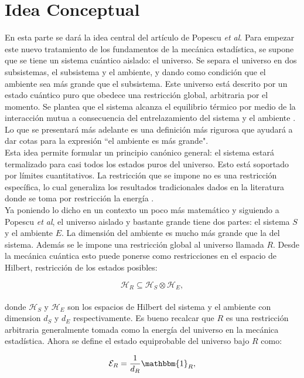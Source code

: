 \section{Idea Conceptual}
En esta parte se dará la idea central del artículo de Popescu \textit{et al}. Para empezar este nuevo tratamiento de los fundamentos de la mecánica estadística, se supone que se tiene un sistema cuántico aislado: el universo. Se separa el universo en dos subsistemas, el subsistema y el ambiente, y dando como condición que el ambiente sea más grande que el subsistema. Este universo está descrito por un estado cuántico puro que obedece una restricción global, arbitraria por el momento. Se plantea que el sistema alcanza el equilibrio térmico por medio de la interacción mutua a consecuencia del entrelazamiento del sistema y el ambiente  \cite{Popescu2006}. Lo que se presentará más adelante es una definición más rigurosa que ayudará a dar cotas para la expresión ``el ambiente es más grande".
\\
Esta idea permite formular un principio canónico general: el sistema estará termalizado para casi todos los estados puros del universo. Esto está soportado por límites cuantitativos. La restricción que se impone no es una restricción específica, lo cual generaliza los resultados tradicionales dados en la literatura donde se toma por restricción la energía \cite{KardarStat}.
\\
Ya poniendo lo dicho en un contexto un poco más matemático y siguiendo a Popescu \textit{et al}, el universo aislado y bastante grande tiene dos partes: el sistema $S$ y el ambiente $E$. La dimensión del ambiente es mucho más grande que la del sistema. Además se le impone una restricción global al universo llamada $R$. Desde la mecánica cuántica esto puede ponerse como restricciones en el espacio de Hilbert, restricción de los estados posibles:

\begin{equation}
\mathcal{H}_{R}\subseteq \mathcal{H}_{S}\otimes \mathcal{H}_{E},
\end{equation}
\\
donde $\mathcal{H}_{S}$ y $\mathcal{H}_{E}$ son los espacios de Hilbert del sistema y el ambiente con dimension $d_{S}$  y $d_{E}$ respectivamente. Es bueno recalcar que $R$ es una restricción arbitraria generalmente tomada como la energía del universo en la mecánica estadística. Ahora se define el estado equiprobable del universo bajo $R$ como:

\begin{equation}
\mathcal{E}_{R} = \frac{1}{d_{R}} \mathbbm{1}_{R},
\end{equation}

